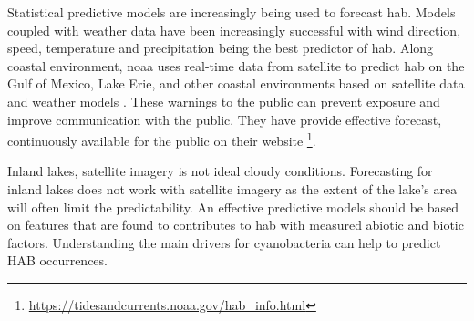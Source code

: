 Statistical predictive models are increasingly being used to forecast \gls{hab}. Models coupled with weather data have been increasingly successful with wind direction, speed, temperature and precipitation being the best predictor of \gls{hab}. Along coastal environment,   \gls{noaa} uses real-time data from satellite to predict \gls{hab} on the Gulf of Mexico, Lake Erie, and other coastal environments based on satellite data and weather models \cite{kavanaugh_assessment_2013}. These warnings to the public can prevent exposure and improve communication with the public. They have provide effective forecast, continuously available for the public on their website \footnote{\url{https://tidesandcurrents.noaa.gov/hab_info.html}}. %

Inland lakes, satellite imagery is not ideal cloudy conditions. Forecasting for inland lakes does not work with satellite imagery as the extent of the lake's area will often limit the predictability. An effective predictive models should be based on features that are found to contributes to \gls{hab} with measured abiotic and biotic factors. Understanding the main drivers for cyanobacteria can help to predict HAB occurrences.

